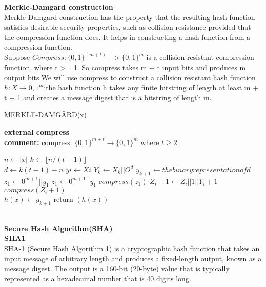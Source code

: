 \documentclass[11pt]{article}
\begin{document}
\newpage
\textbf{Merkle-Damgard construction}\\
  Merkle-Damgard construction has the property that the resulting hash function satisfies desirable security properties, such as collision resistance provided that the compression function does. It helps in constructing a hash function from a compression function.\\
  Suppose $Compress: \{0, 1\}^(m+t) -> \{0, 1\}^m$ is a collision resistant compression function, where t >= 1. So compress takes m + t input bits and produces m output bits.We will use compress to construct a collision resistant hash function $h: X \rightarrow {0, 1}^m$;the hash function h takes any finite bitstring of length at least m + t + 1 and creates a message digest that is a bitstring of length m.\\
\begin{algorithm}
\caption{MERKLE-DAMGÅRD(x)}
\label{alg:merkle-damgard}
\textbf{external compress}\\
\textbf{comment:} compress: $\{0,1\}^{m+t}\rightarrow\{0,1\}^{m}$ where $t\ge2$
\begin{algorithmic}[1]
\State $n\leftarrow |x|$
\State $k\leftarrow \lfloor n/(t-1) \rfloor$ \\
\State $d\leftarrow k(t-1)-n$
    \State $yi \leftarrow Xi$
\EndFor
\State $Y_k\leftarrow X_k || O^d$
\State $y_{k+1} \leftarrow  the binary representation of d$
\State $z_{1}\leftarrow0^{m+1}||y_{1}$
\State $z_1 \leftarrow 0^{m+1} || y_1$
\State $compress(z_1)$
    \State $Z_i+1\leftarrow Z_i || 1 || Y_i+1$
    \State $compress(Z_i+1)$
\EndFor
\\$h(x)\leftarrow g_{k+1}$
\State return $(h(x))$
\end{algorithmic}
\end{algorithm}\\
\textbf{Secure Hash Algorithm(SHA)}\\
\textbf{SHA1}\\
SHA-1 (Secure Hash Algorithm 1) is a cryptographic hash function that takes an input message of arbitrary length and produces a fixed-length output, known as a message digest. The output is a 160-bit (20-byte) value that is typically represented as a hexadecimal number that is 40 digits long.\\
\end{document}
